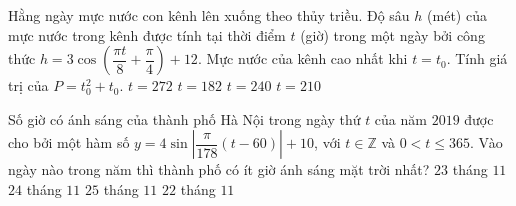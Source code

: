 \begin{ex}%
	Hằng ngày mực nước con kênh lên xuống theo thủy triều. Độ sâu $ h$ (mét) của mực nước trong kênh được tính tại thời điểm $ t$ (giờ) trong một ngày bởi công thức $ h=3\cos\left(\dfrac{\pi t}{8}+\dfrac{\pi}{4}\right)+12$. Mực nước của kênh cao nhất khi $ t=t_0$. Tính giá trị của $ P=t_0^2+t_0$.
	\choice
	{$ t=272$}
	{$ t=182$}
	{$ t=240$}
	{\True $ t=210$}
\end{ex}

\begin{ex}%
	Số giờ có ánh sáng của thành phố Hà Nội trong ngày thứ $t$ của năm $2019$ được cho bởi một hàm số $y=4 \sin \left|\dfrac{\pi}{178}(t-60)\right|+10$, với $t\in\mathbb{Z}$ và $0<t\leq 365$. Vào ngày nào trong năm thì thành phố có ít giờ ánh sáng mặt trời nhất?
	\choice
	{\True $23$ tháng $11$}
	{$24$ tháng $11$}
	{$25$ tháng $11$}
	{$22$ tháng $11$}
\end{ex}



